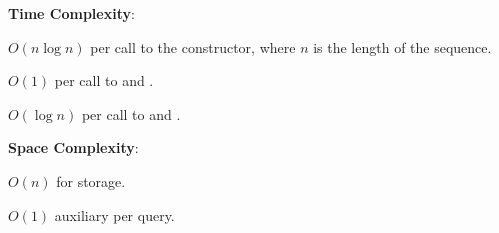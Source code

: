 \textbf{Time Complexity}:
\begin{compactitem}
  \item $O(n \log n)$ per call to the constructor, where $n$ is the length of the sequence.
  \item $O(1)$ per call to  and .
  \item $O(\log n)$ per call to  and .
\end{compactitem}

\textbf{Space Complexity}:
\begin{compactitem}
  \item $O(n)$ for storage.
  \item $O(1)$ auxiliary per query.
\end{compactitem}

